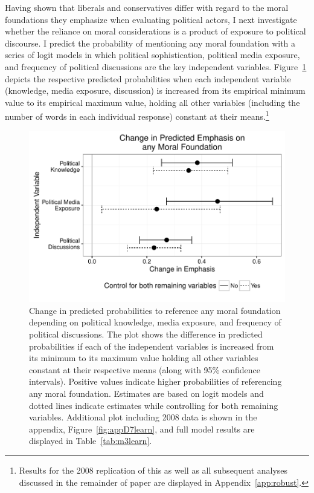 \documentclass[12pt]{article}
\begin{document}
Having shown that liberals and conservatives differ with regard to the moral foundations they emphasize when evaluating political actors, I next investigate whether the reliance on moral considerations is a product of exposure to political discourse. I predict the probability of mentioning any moral foundation with a series of logit models in which political sophistication, political media exposure, and frequency of political discussions are the key independent variables. Figure~\ref{fig:3learn} depicts the respective predicted probabilities when each independent variable (knowledge, media exposure, discussion) is increased from its empirical minimum value to its empirical maximum value, holding all other variables (including the number of words in each individual response) constant at their means.\footnote{Results for the 2008 replication of this as well as all subsequent analyses discussed in the remainder of paper are displayed in Appendix~\ref{app:robust}.}

\begin{figure}[h]\centering
\includegraphics[scale=.9]{../calc/fig/fig3learn.pdf}
\caption{Change in predicted probabilities to reference any moral foundation depending on political knowledge, media exposure, and frequency of political discussions. The plot shows the difference in predicted probabilities if each of the independent variables is increased from its minimum to its maximum value holding all other variables constant at their respective means (along with 95\% confidence intervals). Positive values indicate higher probabilities of referencing any moral foundation. Estimates are based on logit models and dotted lines indicate estimates while controlling for both remaining variables. Additional plot including 2008 data is shown in the appendix, Figure~\ref{fig:appD7learn}, and full model results are displayed in Table~\ref{tab:m3learn}.}\label{fig:3learn}
\end{figure}
\end{document}
